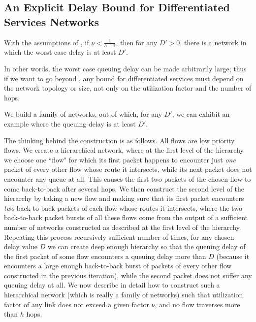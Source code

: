 \subsection{An Explicit Delay Bound for Differentiated Services Networks}

%
%
\begin{proposition}\cite{lebinfocom2001, qofis2000}
With the assumptions of , if $\nu <
\frac{1}{h-1}$, then for any $D' >0$, there is a network in which
the worst case delay is at least $D'$. 
\end{proposition}
In other words, the worst case queuing delay can be made
arbitrarily large; thus if we want to go beyond
, any bound for differentiated services
must depend on the network topology or size, not only on the
utilization factor and the number of hops.

\pr
We build a family of networks, out of which, for any $D'$, we can
exhibit an example where the queuing delay is at least $D'$.

The thinking behind the construction is as follows. All flows are
low priority flows. We create a
  hierarchical network, where at the first level of the
  hierarchy we choose one ``flow" for which its first
  packet happens to encounter just \emph{one} packet of every
  other flow whose route it intersects, while its next packet
  does not encounter any queue at all.  This causes the first
  two packets of the chosen flow to come back-to-back after
  several hops.  We then construct the second level of the
  hierarchy by taking a new flow and making sure that its
  first packet encounters \emph{two} back-to-back packets of each
  flow whose routes it intersects, where the two back-to-back
  packet bursts of all these flows come from the output of a
  sufficient number of networks constructed as described at
  the first level of the hierarchy. Repeating this process
  recursively sufficient number of times,  for any chosen
  delay value $D$ we can create deep enough hierarchy so that
  the queuing delay of the first packet of some flow
  encounters a queuing delay more than $D$ (because it
  encounters a large enough back-to-back burst of packets
  of every other flow constructed in the previous iteration),
  while the second packet does not suffer any queuing delay
  at all.   We now describe in detail how to construct such a
  hierarchical network (which is really a family of networks)
  such that utilization factor of any link does not exceed a
  given factor $\nu$, and no flow traverses more than $h$ hops.

